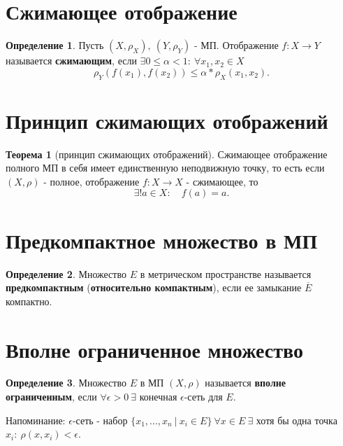 \documentclass{report}
\theoremstyle{definition}
\newtheorem*{definition}{Определение}
\newtheorem*{theorem}{Теорема}
\begin{document}
\section{Сжимающее отображение}

\begin{definition}
    Пусть $(X,\rho_X), \ (Y,\rho_Y)$ - МП. Отображение $f:X\rightarrow Y$ называется \textbf{сжимающим},
    если $\exists 0 \leqslant \alpha < 1: \ \forall x_1,x_2 \in X$
    \begin{equation*}
        \rho_Y(f(x_1),f(x_2)) \leqslant \alpha * \rho_X(x_1,x_2).
    \end{equation*}
\end{definition}

\section{Принцип сжимающих отображений}

\begin{theorem}[принцип сжимающих отображений]
    Сжимающее отображение полного МП в себя имеет единственную неподвижную точку, то есть если
    $(X,\rho)$ - полное, отображение $f:X\rightarrow X$ - сжимающее, то
    \begin{equation*}
        \exists ! a \in X: \quad f(a) = a.
    \end{equation*}
\end{theorem}

\section{Предкомпактное множество в МП}

\begin{definition}
    Множество $E$ в метрическом пространстве называется \textbf{предкомпактным} (\textbf{относительно компактным}),
    если ее замыкание $\overline{E}$ компактно.
\end{definition}

\section{Вполне ограниченное множество}

\begin{definition}
    Множество $E$ в МП $(X,\rho)$ называется \textbf{вполне ограниченным}, если $\forall \epsilon > 0 \ \exists$
    конечная $\epsilon$-сеть для $E$.

    Напоминание: $\epsilon$-сеть - набор $\{x_1,\ldots,x_n \ | \ x_i \in E\} \ \forall x \in E \ \exists$ хотя бы
    одна точка $x_i: \ \rho(x,x_i) < \epsilon$.
\end{definition}
\end{document}
